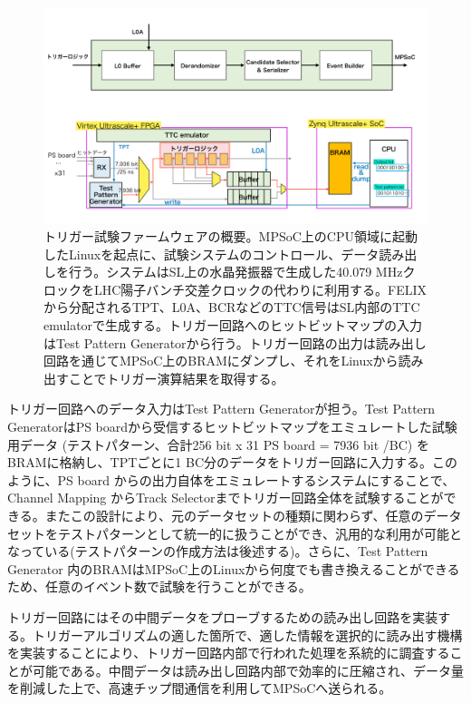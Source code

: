 \begin{figure} 
    \centering
    \includegraphics[width=16cm]{fig/Test/TestSystem_overview.pdf}
    \caption[トリガー試験ファームウェアの概要]{トリガー試験ファームウェアの概要。MPSoC上のCPU領域に起動したLinuxを起点に、試験システムのコントロール、データ読み出しを行う。システムはSL上の水晶発振器で生成した40.079 MHzクロックをLHC陽子バンチ交差クロックの代わりに利用する。FELIXから分配されるTPT、L0A、BCRなどのTTC信号はSL内部のTTC emulatorで生成する。トリガー回路へのヒットビットマップの入力はTest Pattern Generatorから行う。トリガー回路の出力は読み出し回路を通じてMPSoC上のBRAMにダンプし、それをLinuxから読み出すことでトリガー演算結果を取得する。}
    \label{TestSystem_Overview}
\end{figure}

トリガー回路へのデータ入力はTest Pattern Generatorが担う。Test Pattern GeneratorはPS boardから受信するヒットビットマップをエミュレートした試験用データ (テストパターン、合計256 bit x 31 PS board = 7936 bit /BC) をBRAMに格納し、TPTごとに1 BC分のデータをトリガー回路に入力する。このように、PS board からの出力自体をエミュレートするシステムにすることで、Channel Mapping からTrack Selectorまでトリガー回路全体を試験することができる。またこの設計により、元のデータセットの種類に関わらず、任意のデータセットをテストパターンとして統一的に扱うことができ、汎用的な利用が可能となっている(テストパターンの作成方法は後述する)。さらに、Test Pattern Generator 内のBRAMはMPSoC上のLinuxから何度でも書き換えることができるため、任意のイベント数で試験を行うことができる。

トリガー回路にはその中間データをプローブするための読み出し回路を実装する。トリガーアルゴリズムの適した箇所で、適した情報を選択的に読み出す機構を実装することにより、トリガー回路内部で行われた処理を系統的に調査することが可能である。中間データは読み出し回路内部で効率的に圧縮され、データ量を削減した上で、高速チップ間通信を利用してMPSoCへ送られる。

